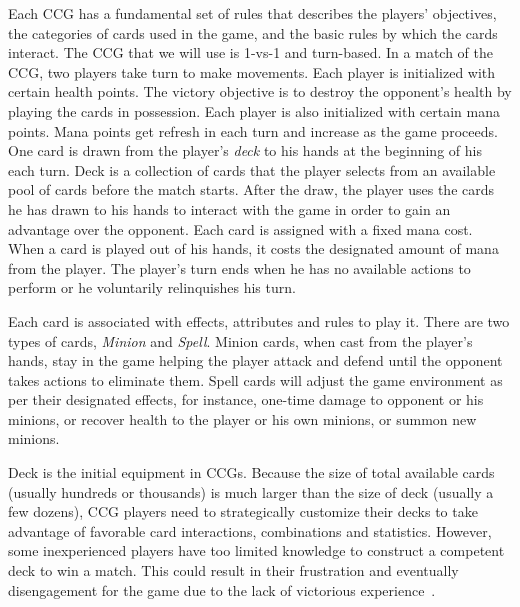 Each CCG has a fundamental set of rules that describes the players' objectives, the categories of cards used in the game, and the basic rules by which the cards interact. The CCG that we will use is 1-vs-1 and turn-based. In a match of the CCG, two players take turn to make movements. Each player is initialized with certain health points. The victory objective is to destroy the opponent's health by playing the cards in possession. Each player is also initialized with certain mana points. Mana points get refresh in each turn and increase as the game proceeds. One card is drawn from the player's \textit{deck} to his hands at the beginning of his each turn. Deck is a collection of cards that the player selects from an available pool of cards before the match starts. After the draw, the player uses the cards he has drawn to his hands to interact with the game in order to gain an advantage over the opponent. Each card is assigned with a fixed mana cost. When a card is played out of his hands, it costs the designated amount of mana from the player. The player's turn ends when he has no available actions to perform or he voluntarily relinquishes his turn. 

Each card is associated with effects, attributes and rules to play it. There are two types of cards, \textit{Minion} and \textit{Spell}. Minion cards, when cast from the player's hands, stay in the game helping the player attack and defend until the opponent takes actions to eliminate them. Spell cards will adjust the game environment as per their designated effects, for instance, one-time damage to opponent or his minions, or recover health to the player or his own minions, or summon new minions. 

%
%
%
%    
%    
%    
%  
%    		
%    

Deck is the initial equipment in CCGs. Because the size of total available cards (usually hundreds or thousands) is much larger than the size of deck (usually a few dozens), CCG players need to strategically customize their decks to take advantage of favorable card interactions, combinations and statistics. However, some inexperienced players have too limited knowledge to construct a competent deck to win a match. This could result in their frustration and eventually disengagement for the game due to the lack of victorious experience~\cite{schoenau2011player,yee2006motivations,sherry2006video,wu2010falling}. 

